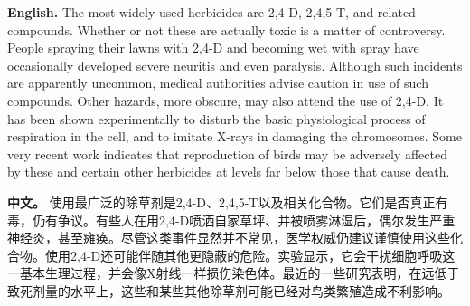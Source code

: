 \noindent\textbf{English.} The most widely used herbicides are 2,4-D, 2,4,5-T, and related compounds. Whether or not these are actually toxic is a matter of controversy. People spraying their lawns with 2,4-D and becoming wet with spray have occasionally developed severe neuritis and even paralysis. Although such incidents are apparently uncommon, medical authorities advise caution in use of such compounds. Other hazards, more obscure, may also attend the use of 2,4-D. It has been shown experimentally to disturb the basic physiological process of respiration in the cell, and to imitate X-rays in damaging the chromosomes. Some very recent work indicates that reproduction of birds may be adversely affected by these and certain other herbicides at levels far below those that cause death.
\par
\noindent\textbf{中文。} 使用最广泛的除草剂是2,4-D、2,4,5-T以及相关化合物。它们是否真正有毒，仍有争议。有些人在用2,4-D喷洒自家草坪、并被喷雾淋湿后，偶尔发生严重神经炎，甚至瘫痪。尽管这类事件显然并不常见，医学权威仍建议谨慎使用这些化合物。使用2,4-D还可能伴随其他更隐蔽的危险。实验显示，它会干扰细胞呼吸这一基本生理过程，并会像X射线一样损伤染色体。最近的一些研究表明，在远低于致死剂量的水平上，这些和某些其他除草剂可能已经对鸟类繁殖造成不利影响。
\par\medskip

